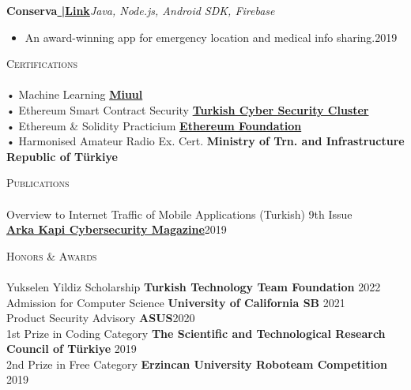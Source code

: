 \documentclass[a4paper]{article}
\newcommand{\lineunder} {
    \vspace*{-8pt} \\
    \hspace*{-18pt} \hrulefill \\
}
\newcommand{\header} [1] {
    {\hspace*{-18pt}\vspace*{6pt} \textsc{#1}}
    \vspace*{-6pt} \lineunder
}
\begin{document}
      {\textbf{Conserva}}\textbf{\href{https://github.com/goeksu/Conserva}{\scriptsize{ |Link}}}\hfill{\sl Java, Node.js, Android SDK, Firebase}\\
          \vspace{-3mm}
\begin{itemize} \itemsep -3pt
\item[]An award-winning app for emergency location and medical info sharing.\hfill{2019}\\
\end{itemize}
          \vspace*{3mm}

      \header{Certifications}
      \vspace{2mm}
      • Machine Learning \textbf{\href{https://www.miuul.com}{Miuul}}\\
\vspace*{1mm}
      • Ethereum Smart Contract Security \textbf{\href{https://siberkume.org.tr/Index}{Turkish Cyber Security Cluster}}\\
\vspace*{1mm}
      • Ethereum \& Solidity Practicium \textbf{\href{https://verified.sertifier.com/en/verify/85223213010096}{Ethereum Foundation}}\\
\vspace*{1mm}
      • Harmonised Amateur Radio Ex. Cert. \textbf{Ministry of Trn. and Infrastructure Republic of Türkiye}\\
\vspace*{1mm}
      \vspace{2mm}

       \header{Publications}
      \vspace{2mm}
      Overview to Internet Traffic of Mobile Applications (Turkish) \hfill 9th Issue\\ 
      \textbf{\href{https://arkakapimag.com}{Arka Kapi Cybersecurity Magazine}}\hfill2019\\
      

\vspace*{1mm}
      \vspace{2mm}

\header{Honors \& Awards}
      \vspace{2mm} 
      Yukselen Yildiz Scholarship \textbf{Turkish Technology Team Foundation} \hfill2022\\
\vspace*{1mm}
      Admission for Computer Science \textbf{University of California SB} \hfill2021\\
\vspace*{1mm}
      Product Security Advisory \textbf{ASUS}\hfill 2020\\
\vspace*{1mm}
      1st Prize in Coding Category \textbf{The Scientific and Technological Research Council of Türkiye} \hfill2019\\
\vspace*{1mm}
      2nd Prize in Free Category \textbf{Erzincan University Roboteam Competition} \hfill2019\\
\vspace*{1mm}

    \ 
    
\end{document}
